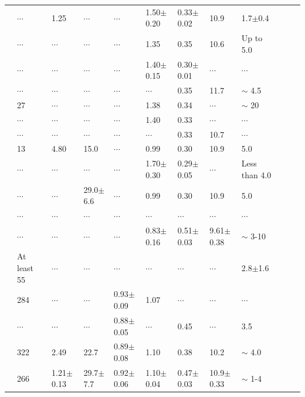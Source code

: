 \documentclass{aa}
\begin{document}
\begin{table}
{\begin{tabular}{llllllllllll}
\citet{1978MNRAS.182..607F} & $\cdots$ & 1.25 & $\cdots$ & $\cdots$ & 1.50$\pm$0.20 & 0.33$\pm$0.02 & 10.9 & 1.7$\pm$0.4\\
\citet{1978MNRAS.184..661L} & $\cdots$ & $\cdots$ & $\cdots$ & $\cdots$ & 1.35 & 0.35 & 10.6 & Up to 5.0\\
\citet{1985AA...151..391T} & $\cdots$ & $\cdots$ & $\cdots$ & $\cdots$ & 1.40$\pm$0.15 & 0.30$\pm$0.01 & $\cdots$ & $\cdots$\\
\citet{1989MNRAS.236..263P} & $\cdots$ & $\cdots$ & $\cdots$ & $\cdots$ & $\cdots$ & 0.35 & 11.7 & $\sim$ 4.5\\
\citet{1991MNRAS.249...76B} & 27 & $\cdots$ & $\cdots$ & $\cdots$ & 1.38 & 0.34 & $\cdots$ & $\sim$ 20\\
\citet{1994RMxAA..29..141F} & $\cdots$ & $\cdots$ & $\cdots$ & $\cdots$ & 1.40 & 0.33 & $\cdots$ & $\cdots$\\
\citet{2003AA...407..925R} & $\cdots$ & $\cdots$ & $\cdots$ & $\cdots$ & $\cdots$ & 0.33 & 10.7 & $\cdots$\\
\citet{2005AA...438.1163K} & 13 & 4.80 & 15.0 & $\cdots$ & 0.99 & 0.30 & 10.9 & 5.0\\
\citet{2007AA...462..157P} & $\cdots$ & $\cdots$ & $\cdots$ & $\cdots$ & 1.70$\pm$0.30 & 0.29$\pm$0.05 & $\cdots$ & Less than 4.0\\
\citet{2008AA...477..165P} & $\cdots$ & $\cdots$ & 29.0$\pm$6.6 & $\cdots$ & 0.99 & 0.30 & 10.9 & 5.0\\
\citet{2010AA...511A..25R} & $\cdots$ & $\cdots$ & $\cdots$ & $\cdots$ & $\cdots$ & $\cdots$ & $\cdots$ & $\cdots$\\
\citet{2018AA...610A..30A} & $\cdots$ & $\cdots$ & $\cdots$ & $\cdots$ & 0.83$\pm$0.16 & 0.51$\pm$0.03 & 9.61$\pm$0.38 & $\sim$ 3-10\\
\citet{2019MNRAS.484.5102K} & At least 55 & $\cdots$ & $\cdots$ & $\cdots$ & $\cdots$ & $\cdots$ & $\cdots$ & 2.8$\pm$1.6\\
\citet{2021ApJ...923..129J} & 284 & $\cdots$ & $\cdots$ & 0.93$\pm$0.09 & 1.07 & $\cdots$ & $\cdots$ & $\cdots$\\
\citet{2022ApJS..262....7H} & $\cdots$ & $\cdots$ & $\cdots$ & 0.88$\pm$0.05 & $\cdots$ & 0.45 & $\cdots$ & 3.5\\
\citet{2024arXiv240305143H} & 322 & 2.49 & 22.7 & 0.89$\pm$0.08 & 1.10 & 0.38 & 10.2 & $\sim$ 4.0\\
\citet{2024arXiv240301030P} & 266 & 1.21$\pm$0.13 & 29.7$\pm$7.7 & 0.92$\pm$0.06 & 1.10$\pm$0.04 & 0.47$\pm$0.03 & 10.9$\pm$0.33 & $\sim$ 1-4\\
\hline
\end{tabular}}
\end{table}
\end{document}
